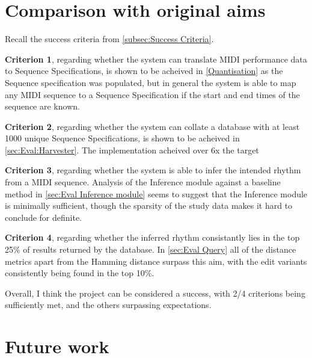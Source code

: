 \documentclass[12pt,twoside,notitlepage]{report}
\begin{document}
	\section{Comparison with original aims}
	Recall the success criteria from \ref{subsec:Success Criteria}.
	
	\textbf{Criterion 1}, regarding whether the system can translate MIDI performance data to Sequence Specifications, is shown to be acheived in \ref{Quantisation} as the Sequence specification was populated, but in general the system is able to map any MIDI sequence to a Sequence Specification if the start and end times of the sequence are known.
	
	\textbf{Criterion 2}, regarding whether the system can collate a database with at least 1000 unique Sequence Specifications, is shown to be acheived in \ref{sec:Eval:Harvester}. The implementation acheived over 6x the target
	
	\textbf{Criterion 3}, regarding whether the system is able to infer the intended rhythm from a MIDI sequence. Analysis of the Inference module against a baseline method in \ref{sec:Eval Inference module} seems to suggest that the Inference module is minimally sufficient, though the sparsity of the study data makes it hard to conclude for definite. 
	
	\textbf{Criterion 4}, regarding whether the inferred rhythm consistantly lies in the top 25\% of results returned by the database. In \ref{sec:Eval Query} all of the distance metrics apart from the Hamming distance surpass this aim, with the edit variants consistently being found in the top 10\%.
	
	Overall, I think the project can be considered a success, with 2/4 criterions being sufficiently met, and the others surpassing expectations.
	
	\section{Future work}
\end{document}
